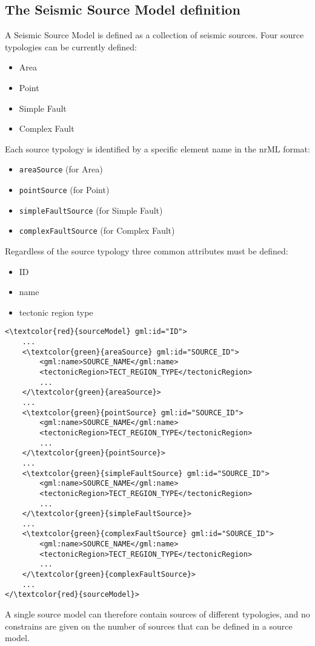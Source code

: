 \subsection{The Seismic Source Model definition}\label{seismicSourceNrml}
A Seismic Source Model is defined as a collection of seismic sources. Four source typologies can be currently defined:
\begin{itemize}
\item Area
\item Point
\item Simple Fault
\item Complex Fault
\end{itemize}
Each source typology is identified by a specific element name in the nrML format:
\begin{itemize}
\item \Verb+areaSource+ (for Area)
\item \Verb+pointSource+ (for Point)
\item \Verb+simpleFaultSource+ (for Simple Fault)
\item \Verb+complexFaultSource+ (for Complex Fault)
\end{itemize}
Regardless of the source typology three common attributes must be defined:
\begin{itemize}
\item ID
\item name
\item tectonic region type 
\end{itemize}
\begin{Verbatim}[frame=single, commandchars=\\\{\},fontsize=\normalsize, samepage=true]
<\textcolor{red}{sourceModel} gml:id="ID">
	...
	<\textcolor{green}{areaSource} gml:id="SOURCE_ID">
		<gml:name>SOURCE_NAME</gml:name>
		<tectonicRegion>TECT_REGION_TYPE</tectonicRegion>
		...
	</\textcolor{green}{areaSource}>
	...
	<\textcolor{green}{pointSource} gml:id="SOURCE_ID">
		<gml:name>SOURCE_NAME</gml:name>
		<tectonicRegion>TECT_REGION_TYPE</tectonicRegion>
		...
	</\textcolor{green}{pointSource}>
	...
	<\textcolor{green}{simpleFaultSource} gml:id="SOURCE_ID">
		<gml:name>SOURCE_NAME</gml:name>
		<tectonicRegion>TECT_REGION_TYPE</tectonicRegion>
		...
	</\textcolor{green}{simpleFaultSource}>
	...
	<\textcolor{green}{complexFaultSource} gml:id="SOURCE_ID">
		<gml:name>SOURCE_NAME</gml:name>
		<tectonicRegion>TECT_REGION_TYPE</tectonicRegion>
		...
	</\textcolor{green}{complexFaultSource}>
	...
</\textcolor{red}{sourceModel}>
\end{Verbatim}
A single source model can therefore contain sources of different typologies, and no constrains are given on the number of sources that can be defined in a source model.


